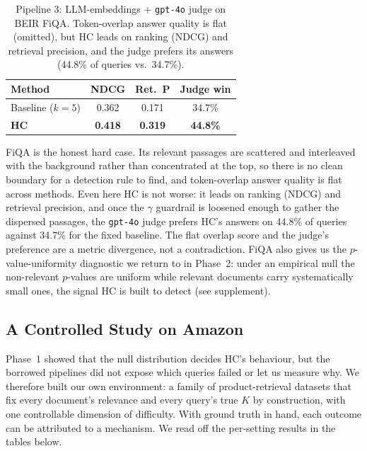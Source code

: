 \documentclass[letterpaper]{article} %
\newcommand{\FqBaseNDCG}{0.362}\newcommand{\FqHCNDCG}{0.418}
\newcommand{\FqBasePre}{0.171}\newcommand{\FqHCPre}{0.319}
\newcommand{\FqJudgeWin}{44.8}\newcommand{\FqJudgeLose}{34.7}
\begin{document}
\begin{table}[t]
\centering\small
\setlength{\extrarowheight}{1.5pt}
\begin{tabular}{|l|c|c|c|}
\hline
\textbf{Method} & \textbf{NDCG} & \textbf{Ret.\ P} & \textbf{Judge win} \\
\hline
Baseline ($k{=}5$) & \FqBaseNDCG & \FqBasePre & \FqJudgeLose\% \\
\hline
\textbf{HC} & \textbf{\FqHCNDCG} & \textbf{\FqHCPre} & \textbf{\FqJudgeWin\%} \\
\hline
\end{tabular}
\caption{Pipeline 3: LLM-embeddings + \texttt{gpt-4o} judge on BEIR FiQA.
Token-overlap answer quality is flat (omitted), but HC leads on ranking
(NDCG) and retrieval precision, and the judge prefers its answers
(\FqJudgeWin\% of queries vs.\ \FqJudgeLose\%).}
\label{tab:p1c}
\end{table}

FiQA is the honest hard case. Its relevant passages are scattered and
interleaved with the background rather than concentrated at the top, so
there is no clean boundary for a detection rule to find, and token-overlap
answer quality is flat across methods. Even here HC is not worse: it
leads on ranking (NDCG) and retrieval precision, and once the $\gamma$
guardrail is loosened enough to gather the dispersed passages, the
\texttt{gpt-4o} judge prefers HC's answers on \FqJudgeWin\% of queries
against \FqJudgeLose\% for the fixed baseline. The flat overlap score and
the judge's preference are a metric divergence, not a contradiction.
FiQA also gives us the $p$-value-uniformity diagnostic we return to in
Phase~2: under an empirical null the non-relevant $p$-values are uniform
while relevant documents carry systematically small ones, the signal HC
is built to detect (see supplement).

\subsection{A Controlled Study on Amazon}
\label{sec:amazon}
Phase~1 showed that the null distribution decides HC's behaviour, but the
borrowed pipelines did not expose which queries failed or let us measure
why. We therefore built our own environment: a family of product-retrieval
datasets that fix every document's relevance and every query's true $K$ by
construction, with one controllable dimension of difficulty. With ground
truth in hand, each outcome can be attributed to a mechanism. We read off the
per-setting results in the tables below.
\end{document}
